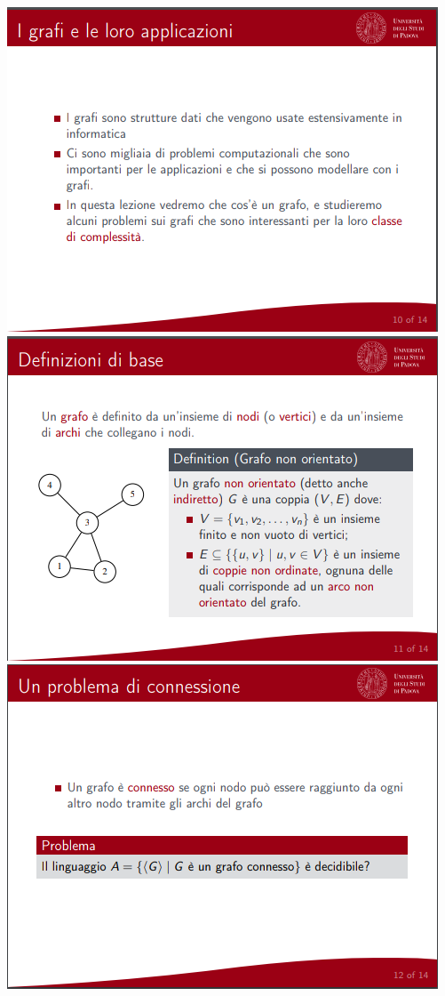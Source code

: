 \documentclass[]{article}
\begin{document}
				\begin{center}
					\includegraphics[scale=0.8]{algoritmo1.png}
					\includegraphics[scale=0.8]{algoritmo2.png}
					\includegraphics[scale=0.8]{algoritmo3.png}

\end{center}
\end{document}
